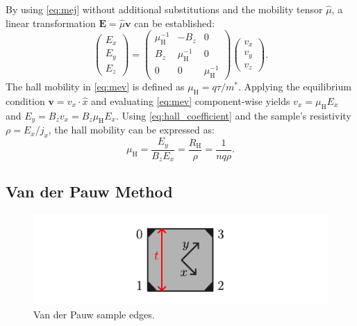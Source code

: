 By using \cref{eq:mej} without additional substitutions and the mobility tensor 
$\hat{\mu}$, a linear transformation $\mathbf{E}=\hat{\mu} \mathbf{v}$ 
can be established:
\begin{equation}
	\begin{pmatrix}
		E_{x} \\
		E_{y} \\
		E_{z}
	\end{pmatrix}
	=\begin{pmatrix}
		\mu_\mathrm{H}^{-1} & -B_{z}              & 0                   \\
		B_{z}               & \mu_\mathrm{H}^{-1} & 0                   \\
		0                   & 0                   & \mu_\mathrm{H}^{-1}
	\end{pmatrix}
	\begin{pmatrix}
		v_{x} \\
		v_{y} \\
		v_{z}
	\end{pmatrix}.
	\label{eq:mev}
\end{equation}
The hall mobility in \cref{eq:mev} is defined as $\mu_{\mathrm{H}}= q\tau / m^{*}$.
Applying the equilibrium condition $\mathbf{v}=v_x \cdot \hat{x}$ and evaluating 
\cref{eq:mev} component-wise yields $v_{x} = \mu_{\mathrm{H}}E_{x}$ and 
$E_{y}=B_{z}v_{x}=B_{z}\mu_{\mathrm{H}}E_{x}$.
Using \cref{eq:hall_coefficient} and the sample's resistivity $\rho=E_x / j_x$, 
the hall mobility can be expressed as:
\begin{equation}
	\mu_{\mathrm{H}}=\frac{E_y}{B_z E_x} =\frac{R_{\mathrm{H}}}{\rho} =\frac{1}{nq\rho}.
	\label{eq:hall_mobility}
\end{equation}

\subsection{Van der Pauw Method}
\begin{figure}
	\centering
	\includegraphics{../assets/van_der_pauw.pdf}
	\caption{Van der Pauw sample edges.}
	\label{fig:van_der_pauw}
\end{figure}

